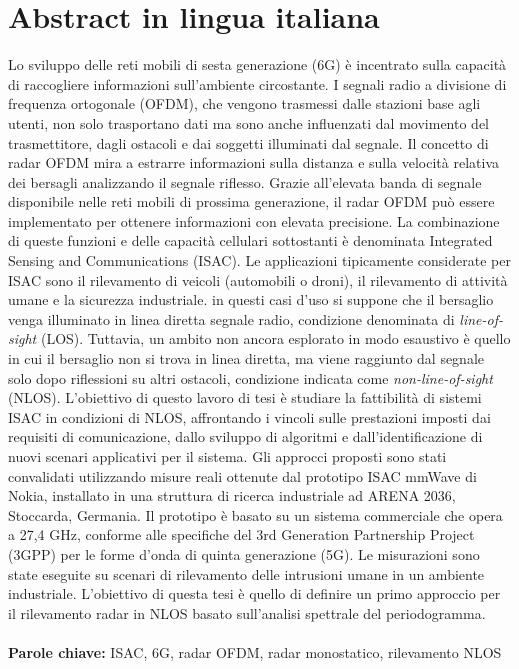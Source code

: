 \documentclass{Configuration_Files/PoliMi3i_thesis}
\begin{document}
\chapter*{Abstract in lingua italiana}
Lo sviluppo delle reti mobili di sesta generazione (6G) è incentrato sulla capacità di raccogliere informazioni sull'ambiente circostante.
I segnali radio a divisione di frequenza ortogonale (OFDM), che vengono trasmessi dalle stazioni base agli utenti, non solo trasportano dati ma sono anche influenzati dal movimento del trasmettitore, dagli ostacoli e dai soggetti illuminati dal segnale.
Il concetto di radar OFDM mira a estrarre informazioni sulla distanza e sulla velocità relativa dei bersagli analizzando il segnale riflesso.
Grazie all'elevata banda di segnale disponibile nelle reti mobili di prossima generazione, il radar OFDM può essere implementato per ottenere informazioni con elevata precisione.
La combinazione di queste funzioni e delle capacità cellulari sottostanti
è denominata Integrated Sensing and Communications (ISAC). Le applicazioni tipicamente considerate per ISAC sono il rilevamento di veicoli (automobili o droni), il rilevamento di attività umane e la sicurezza industriale.
in questi casi d'uso si suppone che il bersaglio venga illuminato in linea diretta segnale radio, condizione denominata di \textit{line-of-sight} (LOS). Tuttavia, un ambito non ancora esplorato in modo esaustivo è quello in cui il bersaglio non si trova in linea diretta, ma viene raggiunto dal segnale solo dopo riflessioni su altri ostacoli, condizione indicata come \textit{non-line-of-sight} (NLOS).
L'obiettivo di questo lavoro di tesi è studiare la fattibilità di sistemi ISAC in condizioni di NLOS, affrontando i vincoli sulle prestazioni imposti dai requisiti di comunicazione, dallo sviluppo di algoritmi e dall'identificazione di nuovi scenari applicativi per il sistema.
Gli approcci proposti sono stati convalidati utilizzando misure reali
ottenute dal prototipo ISAC mmWave di Nokia, installato in
una struttura di ricerca industriale ad ARENA 2036, Stoccarda, Germania. 
Il prototipo è basato su un sistema commerciale che opera a 27,4 GHz, conforme alle specifiche del 3rd Generation Partnership Project (3GPP) per le forme d'onda di quinta generazione (5G).
Le misurazioni sono state eseguite su scenari di rilevamento delle intrusioni umane in un ambiente industriale. 
L'obiettivo di questa tesi è quello di definire un primo approccio per il rilevamento radar in NLOS basato sull'analisi spettrale del periodogramma.
\\
\\
\textbf{Parole chiave:} ISAC, 6G, radar OFDM, radar monostatico, rilevamento NLOS %
\end{document}
